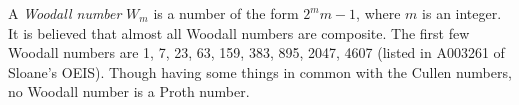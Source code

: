 \documentclass[12pt]{article}
\begin{document}
A {\em Woodall number} $W_m$ is a number of the form $2^m m - 1$, where $m$ is an integer. It is believed that almost all Woodall numbers are composite. The first few Woodall numbers are 1, 7, 23, 63, 159, 383, 895, 2047, 4607 (listed in A003261 of Sloane's OEIS). Though having some things in common with the Cullen numbers, no Woodall number is a Proth number.
\end{document}
